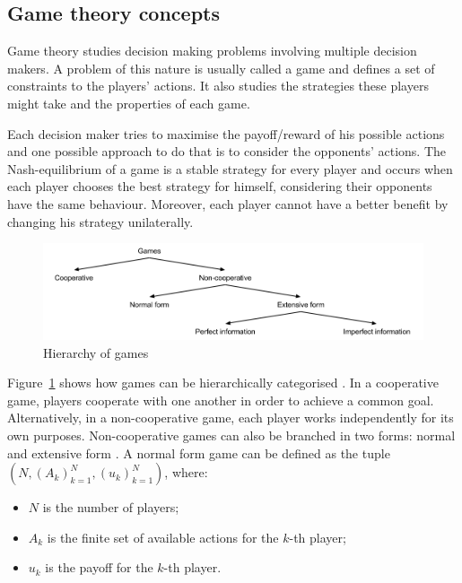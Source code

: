 \subsection{Game theory concepts}

Game theory studies decision making problems involving multiple decision makers.
A problem of this nature is usually called a game and defines a set of constraints to the players' actions.
It also studies the strategies these players might take and the properties of each game.

Each decision maker tries to maximise the payoff/reward of his possible actions and one possible approach to do that is to consider the opponents' actions.
The Nash-equilibrium \cite{Nash1950} of a game is a stable strategy for every player and occurs when each player chooses the best strategy for himself, considering their opponents have the same behaviour.
Moreover, each player cannot have a better benefit by changing his strategy unilaterally.

\begin{figure}
\centering
\includegraphics[width=1\textwidth]{./img/gamesHierarchy}
\caption{Hierarchy of games}
\label{fig:games}
\end{figure}

Figure~\ref{fig:games} shows how games can be hierarchically categorised \cite{Osborne2011}.
In a cooperative game, players cooperate with one another in order to achieve a common goal.
Alternatively, in a non-cooperative game, each player works independently for its own purposes.
Non-cooperative games can also be branched in two forms: normal and extensive form \cite{Shoham2010}.
A normal form game can be defined as the tuple $(N,(A_k)_{k=1}^{N},(u_k)_{k=1}^{N})$, where:

\begin{itemize}
\item $N$ is the number of players;
\item $A_k$ is the finite set of available actions for the $k$-th player;
\item $u_k$ is the payoff for the $k$-th player.
\end{itemize}

